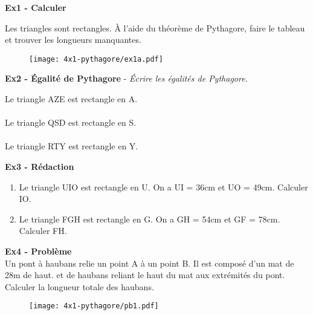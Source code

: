 



\textbf{Ex1 - Calculer}

Les triangles sont rectangles. À l'aide du théorème de Pythagore, faire le tableau et trouver les longueurs manquantes. 

\begin{figure}[H]
  \centering
  \texttt{[image: 4x1-pythagore/ex1a.pdf]}
\end{figure}

\Pointilles[5] 

\textbf{Ex2 - Égalité de Pythagore} - \textit{Écrire les égalités de Pythagore.}

\begin{multicols}{3}
Le triangle AZE est rectangle en A. \\ \Pointilles[1] \\
Le triangle QSD est rectangle en S. \\ \Pointilles[1] \\
Le triangle RTY est rectangle en Y. \\ \Pointilles[1] 
\end{multicols}

\textbf{Ex3 - Rédaction}

\begin{multicols}{2} \begin{enumerate}
  \item Le triangle UIO est rectangle en U. On a UI = 36cm et UO = 49cm. Calculer IO. \\ \Pointilles[7] \columnbreak
  \item Le triangle FGH est rectangle en G. On a GH = 54cm et GF = 78cm. Calculer FH. \\ \Pointilles[7]
\end{enumerate} \end{multicols} 

\begin{multicols}{2} 

\textbf{Ex4 - Problème} \\

Un pont à haubans relie un point A à un point B. Il est composé d'un mat de 28m de haut. et de haubans reliant le haut du mat aux extrémités du pont. Calculer la longueur totale des haubans. \columnbreak

\begin{figure}[H]
  \centering
  \texttt{[image: 4x1-pythagore/pb1.pdf]}
\end{figure}

\end{multicols} 

\Pointilles[8]

